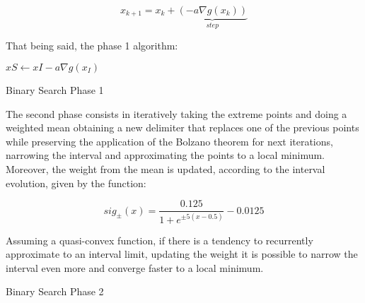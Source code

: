 \begin{equation}
    x_{k+1} = x_k + \underbrace{(- a \nabla g(x_{k}))}_{step}
    \label{eq:Binary_Search_Phase1_gradDesc}
\end{equation}

That being  said, the phase 1 algorithm: 

  \begin{algorithm}
    $xS \gets xI - a \nabla g(x_I)$    
    \caption{Binary Search Phase 1} \label{alg:Binary_Search_Phase_1}
  \end{algorithm}


The second phase consists in iteratively taking the extreme points and doing a weighted mean obtaining a new delimiter that replaces one of the previous points while preserving the application of the Bolzano theorem for next iterations, narrowing the interval and approximating the points to a local minimum. Moreover, the weight from the mean is updated, according to the interval evolution, given by the function:

\begin{equation}
    sig_{\pm}(x) = \frac{0.125}{1+e^{\pm5(x-0.5)}} -0.0125
    \label{eq:binsea_weight_update_function}
\end{equation}

Assuming a quasi-convex function, if there is a tendency to recurrently approximate to an interval limit, updating the weight it is possible to narrow the interval even more and converge faster to a local minimum.

  \begin{algorithm}
    \caption{Binary Search Phase 2} \label{alg:Binary_Search_Phase_2}
  \end{algorithm}



